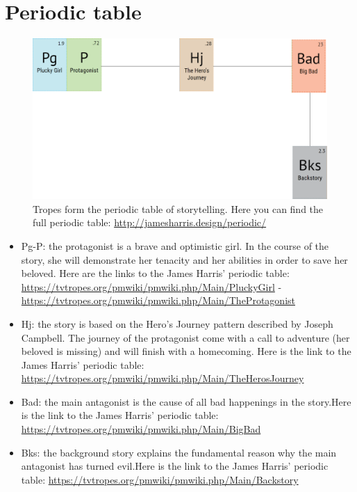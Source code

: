 \section{Periodic table}

\begin{figure}[H]
  \centering
  \includegraphics[width=\textwidth]{Images/Diagrams/periodicTable}
  \caption{Tropes form the periodic table of storytelling. Here you can find the full periodic table: \url{http://jamesharris.design/periodic/}}
\end{figure}

\begin{itemize}
\item Pg-P: the protagonist is a brave and optimistic girl. In the course of the story, she will demonstrate her tenacity and her abilities in order to save her beloved. Here are the links to the James Harris' periodic table: \url{https://tvtropes.org/pmwiki/pmwiki.php/Main/PluckyGirl} - \url{https://tvtropes.org/pmwiki/pmwiki.php/Main/TheProtagonist}

\item Hj: the story is based on the Hero's Journey pattern described by Joseph Campbell. The journey of the protagonist come with a call to adventure (her beloved is missing) and will finish with a homecoming. Here is the link to the James Harris' periodic table: \url{https://tvtropes.org/pmwiki/pmwiki.php/Main/TheHerosJourney}

\item Bad: the main antagonist is the cause of all bad happenings in the story.Here is the link to the James Harris' periodic table: \url{https://tvtropes.org/pmwiki/pmwiki.php/Main/BigBad}

\item Bks: the background story explains the fundamental reason why the main antagonist has turned evil.Here is the link to the James Harris' periodic table: \url{https://tvtropes.org/pmwiki/pmwiki.php/Main/Backstory}
\end{itemize}
